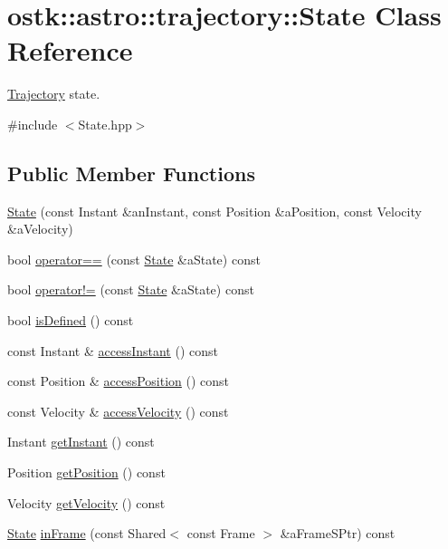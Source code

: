 \hypertarget{classostk_1_1astro_1_1trajectory_1_1_state}{}\section{ostk\+:\+:astro\+:\+:trajectory\+:\+:State Class Reference}
\label{classostk_1_1astro_1_1trajectory_1_1_state}


\hyperlink{classostk_1_1astro_1_1_trajectory}{Trajectory} state.  




{\ttfamily \#include $<$State.\+hpp$>$}

\subsection*{Public Member Functions}
\begin{DoxyCompactItemize}
\item 
\hyperlink{classostk_1_1astro_1_1trajectory_1_1_state_a8628aceae903c9492f0fb269888434b0}{State} (const Instant \&an\+Instant, const Position \&a\+Position, const Velocity \&a\+Velocity)
\item 
bool \hyperlink{classostk_1_1astro_1_1trajectory_1_1_state_acd68798b63a7e3a89e61b4b668d8dbb0}{operator==} (const \hyperlink{classostk_1_1astro_1_1trajectory_1_1_state}{State} \&a\+State) const
\item 
bool \hyperlink{classostk_1_1astro_1_1trajectory_1_1_state_a53ac2b13092bc7777efa14362fec4c46}{operator!=} (const \hyperlink{classostk_1_1astro_1_1trajectory_1_1_state}{State} \&a\+State) const
\item 
bool \hyperlink{classostk_1_1astro_1_1trajectory_1_1_state_a09966efb00e3206cc2d20935c55658ad}{is\+Defined} () const
\item 
const Instant \& \hyperlink{classostk_1_1astro_1_1trajectory_1_1_state_afc21870411eef52ce1293e31eda16d3c}{access\+Instant} () const
\item 
const Position \& \hyperlink{classostk_1_1astro_1_1trajectory_1_1_state_a711322a78c02f981d11ebec2ca0a0cd4}{access\+Position} () const
\item 
const Velocity \& \hyperlink{classostk_1_1astro_1_1trajectory_1_1_state_a7f6d626b9d5f045e026cd1ff2ea33200}{access\+Velocity} () const
\item 
Instant \hyperlink{classostk_1_1astro_1_1trajectory_1_1_state_af1ba3040b895b0963d5fb96a0756cc2b}{get\+Instant} () const
\item 
Position \hyperlink{classostk_1_1astro_1_1trajectory_1_1_state_ad5ceac322a929f0f62214a663a21f4ae}{get\+Position} () const
\item 
Velocity \hyperlink{classostk_1_1astro_1_1trajectory_1_1_state_a1a992dcad42fb3094766907a9472e7e0}{get\+Velocity} () const
\item 
\hyperlink{classostk_1_1astro_1_1trajectory_1_1_state}{State} \hyperlink{classostk_1_1astro_1_1trajectory_1_1_state_aa9c95303df830f9dfed347231961dcf6}{in\+Frame} (const Shared$<$ const Frame $>$ \&a\+Frame\+S\+Ptr) const
\end{DoxyCompactItemize}
